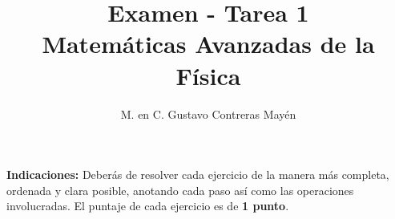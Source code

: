 
\usepackage{apacite}
\title{Examen - Tarea 1 \\[0.3em]  \large{Matemáticas Avanzadas de la Física}\vspace{-3ex}}
\author{M. en C. Gustavo Contreras Mayén}
\date{ }

\vspace{-4cm}
\maketitle
\fontsize{14}{14}\selectfont

\textbf{Indicaciones: } Deberás de resolver cada ejercicio de la manera más completa, ordenada y clara posible, anotando cada paso así como las operaciones involucradas. El puntaje de cada ejercicio es de \textbf{1 punto}.

